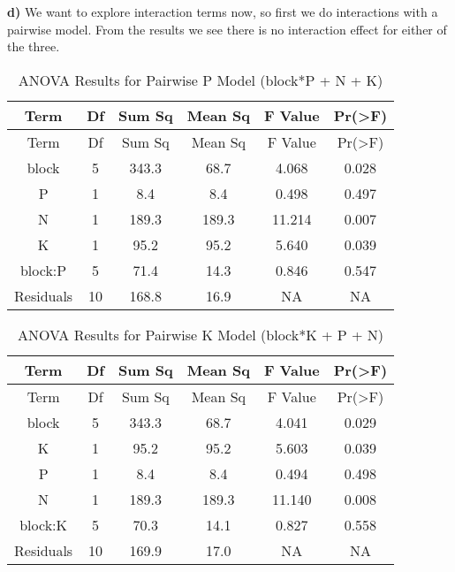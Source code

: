 \documentclass[
]{article}
\begin{document}
\textbf{d)} We want to explore interaction terms now, so first we do
interactions with a pairwise model. From the results we see there is no
interaction effect for either of the three.

\begin{longtable}[]{@{}cccccc@{}}
\caption{ANOVA Results for Pairwise P Model (block*P + N +
K)}\tabularnewline
\toprule\noalign{}
Term & Df & Sum Sq & Mean Sq & F Value & Pr(\textgreater F) \\
\midrule\noalign{}
\endfirsthead
\toprule\noalign{}
Term & Df & Sum Sq & Mean Sq & F Value & Pr(\textgreater F) \\
\midrule\noalign{}
\endhead
\bottomrule\noalign{}
\endlastfoot
block & 5 & 343.3 & 68.7 & 4.068 & 0.028 \\
P & 1 & 8.4 & 8.4 & 0.498 & 0.497 \\
N & 1 & 189.3 & 189.3 & 11.214 & 0.007 \\
K & 1 & 95.2 & 95.2 & 5.640 & 0.039 \\
block:P & 5 & 71.4 & 14.3 & 0.846 & 0.547 \\
Residuals & 10 & 168.8 & 16.9 & NA & NA \\
\end{longtable}

\begin{longtable}[]{@{}cccccc@{}}
\caption{ANOVA Results for Pairwise K Model (block*K + P +
N)}\tabularnewline
\toprule\noalign{}
Term & Df & Sum Sq & Mean Sq & F Value & Pr(\textgreater F) \\
\midrule\noalign{}
\endfirsthead
\toprule\noalign{}
Term & Df & Sum Sq & Mean Sq & F Value & Pr(\textgreater F) \\
\midrule\noalign{}
\endhead
\bottomrule\noalign{}
\endlastfoot
block & 5 & 343.3 & 68.7 & 4.041 & 0.029 \\
K & 1 & 95.2 & 95.2 & 5.603 & 0.039 \\
P & 1 & 8.4 & 8.4 & 0.494 & 0.498 \\
N & 1 & 189.3 & 189.3 & 11.140 & 0.008 \\
block:K & 5 & 70.3 & 14.1 & 0.827 & 0.558 \\
Residuals & 10 & 169.9 & 17.0 & NA & NA \\
\end{longtable}
\end{document}
